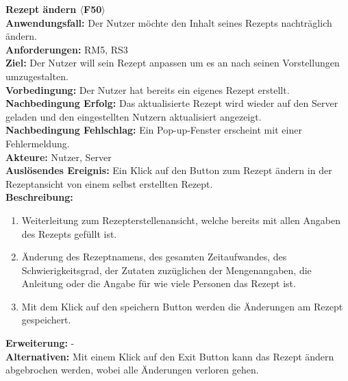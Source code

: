 \documentclass[parskip=full]{scrartcl}
\begin{document}
\textbf{Rezept ändern $\langle$F50$\rangle$}\\
\textbf{Anwendungsfall:} Der Nutzer möchte den Inhalt seines Rezepts nachträglich ändern.\\
\textbf{Anforderungen:} RM5, RS3\\
\textbf{Ziel:} Der Nutzer will sein Rezept anpassen um es an nach seinen Vorstellungen umzugestalten.\\
\textbf{Vorbedingung:} Der Nutzer hat bereits ein eigenes Rezept erstellt.\\
\textbf{Nachbedingung Erfolg:} Das aktualisierte Rezept wird wieder auf den Server geladen und den eingestellten Nutzern aktualisiert angezeigt. \\
\textbf{Nachbedingung Fehlschlag:} Ein Pop-up-Fenster erscheint mit einer Fehlermeldung.\\
\textbf{Akteure:} Nutzer, Server\\
\textbf{Auslösendes Ereignis:} Ein Klick auf den Button zum Rezept ändern in der Rezeptansicht von einem selbst erstellten Rezept.\\
\textbf{Beschreibung:}
\begin{enumerate}
    \item Weiterleitung zum Rezepterstellenansicht, welche bereits mit allen Angaben des Rezepts gefüllt ist.
    \item Änderung des Rezeptnamens, des gesamten Zeitaufwandes, des Schwierigkeitsgrad, der Zutaten zuzüglichen der Mengenangaben, die Anleitung oder die Angabe für wie viele Personen das Rezept ist.
    \item Mit dem Klick auf den speichern Button werden die Änderungen am Rezept gespeichert.
\end{enumerate}
\textbf{Erweiterung:} -\\
\textbf{Alternativen:} Mit einem Klick auf den Exit Button kann das Rezept ändern abgebrochen werden, wobei alle Änderungen verloren gehen.\\
\newpage
\end{document}
